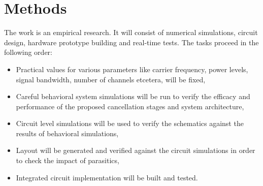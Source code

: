 \documentclass[onecolumn,draftcls,journal]{IEEEtran}
\begin{document}

\IEEEpubidadjcol
\vspace{-.2in}
\section{Methods}
\vspace{-.1in}
The work is an empirical research. It will consist of numerical simulations, circuit design,  hardware prototype building and  real-time tests. The tasks proceed in  the following order:
\begin{itemize}
\item Practical values for various parameters like carrier frequency, power levels, signal bandwidth, number of channels etcetera, will be fixed,
\item Careful behavioral system simulations will be run to verify the  efficacy  and performance of the proposed cancellation stages and system architecture,
\item Circuit level simulations will be used to verify the schematics against the results of behavioral simulations,
\item Layout will be generated and verified against the circuit simulations in order to check the impact of parasitics,
\item Integrated circuit implementation will be built  and tested.
\end{itemize}
\end{document}
